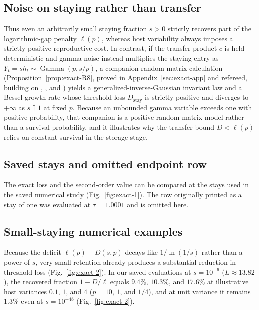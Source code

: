 \subsection{Noise on staying rather than transfer}\label{esm:exact-noisy-staying}

Thus even an arbitrarily small staying fraction $s > 0$ strictly recovers part of the logarithmic-gap penalty $\ell(p)$, whereas host variability always imposes a strictly positive reproductive cost. In contrast, if the transfer product $c$ is held deterministic and gamma noise instead multiplies the staying entry as $Y_t = s h_t \sim \operatorname{Gamma}(p, s/p)$, a companion random-matrix calculation (Proposition~\ref{prop:exact-R8}, proved in Appendix~\ref{sec:exact-app} and refereed, building on \citealp{letac1983}, \citealp{tourigny2007}, and \citealp{marklof2008}) yields a generalized-inverse-Gaussian invariant law and a Bessel growth rate whose threshold loss $D_{\mathrm{stay}}$ is strictly positive and diverges to $+\infty$ as $s \uparrow 1$ at fixed $p$. Because an unbounded gamma variable exceeds one with positive probability, that companion is a positive random-matrix model rather than a survival probability, and it illustrates why the transfer bound $D < \ell(p)$ relies on constant survival in the storage stage.

\subsection{Saved stays and omitted endpoint row}\label{esm:exact-saved-stays}

The exact loss and the second-order value can be compared at the stays used in the saved numerical study (Fig.~\ref{fig:exact-1}). The row originally printed as a stay of one was evaluated at $\tau=1.0001$ and is omitted here.

\subsection{Small-staying numerical examples}\label{esm:exact-small-stays}

Because the deficit $\ell(p) - D(s,p)$ decays like $1/\ln(1/s)$ rather than a power of $s$, very small retention already produces a substantial reduction in threshold loss (Fig.~\ref{fig:exact-2}). In our saved evaluations at $s = 10^{-6}$ ($L \approx 13.82$), the recovered fraction $1 - D/\ell$ equals $9.4\%$, $10.3\%$, and $17.6\%$ at illustrative host variances $0.1$, $1$, and $4$ ($p = 10$, $1$, and $1/4$), and at unit variance it remains $1.3\%$ even at $s = 10^{-48}$ (Fig.~\ref{fig:exact-2}).

